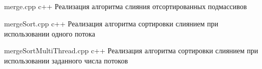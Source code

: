 \begin{appendices}
	\chapter{}
	{merge.cpp} 
	{c++} 
	{Реализация алгоритма слияния отсортированных подмассивов} 
	
	{mergeSort.cpp} 
	{c++} 
	{Реализация алгоритма сортировки слиянием при использовании одного потока} 
	
	{mergeSortMultiThread.cpp} 
	{c++} 
	{Реализация алгоритма сортировки слиянием при использовании заданного числа потоков} 
\end{appendices}